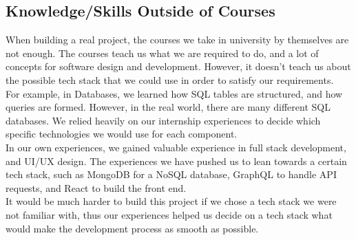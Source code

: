 \documentclass{article}
\begin{document}
\subsection{Knowledge/Skills Outside of Courses}

When building a real project, the courses we take in university by themselves
are not enough. The courses teach us what we are required to do, and a lot of
concepts for software design and development. However, it doesn't teach us about
the possible tech stack that we could use in order to satisfy our requirements. \\

For example, in Databases, we learned how SQL tables are structured, and how
queries are formed. However, in the real world, there are many different SQL
databases. We relied heavily on our internship experiences to decide which
specific technologies we would use for each component.\\

In our own experiences, we gained valuable experience in full stack development,
and UI/UX design. The experiences we have pushed us to lean towards a certain tech 
stack, such as MongoDB for a NoSQL database, GraphQL to handle API requests, and React 
to build the front end. \\ 

It would be much harder to build this project if we chose a tech
stack we were not familiar with, thus our experiences helped us decide on a tech
stack what would make the development process as smooth as possible.
\end{document}
